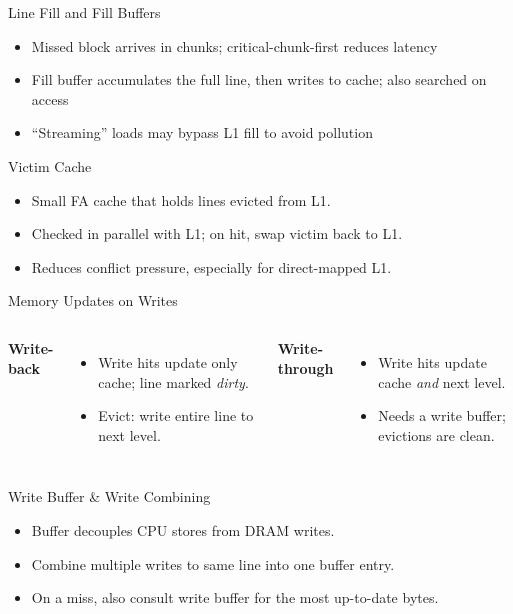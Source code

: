 \documentclass[aspectratio=169,12pt]{beamer}
\begin{document}
\begin{frame}{Line Fill and Fill Buffers}
\begin{itemize}
  \item Missed block arrives in chunks; critical-chunk-first reduces latency
  \item Fill buffer accumulates the full line, then writes to cache; also searched on access
  \item ``Streaming'' loads may bypass L1 fill to avoid pollution
\end{itemize}
\end{frame}

\begin{frame}{Victim Cache}
\begin{itemize}
  \item Small FA cache that holds lines evicted from L1.
  \item Checked in parallel with L1; on hit, swap victim back to L1.
  \item Reduces conflict pressure, especially for direct-mapped L1.
\end{itemize}
\end{frame}

\begin{frame}{Memory Updates on Writes}
\begin{columns}[T]
\textbf{Write-back}
\begin{itemize}
  \item Write hits update only cache; line marked \emph{dirty}.
  \item Evict: write entire line to next level.
\end{itemize}
\textbf{Write-through}
\begin{itemize}
  \item Write hits update cache \emph{and} next level.
  \item Needs a write buffer; evictions are clean.
\end{itemize}
\end{columns}
\end{frame}

\begin{frame}{Write Buffer \& Write Combining}
\begin{itemize}
  \item Buffer decouples CPU stores from DRAM writes.
  \item Combine multiple writes to same line into one buffer entry.
  \item On a miss, also consult write buffer for the most up-to-date bytes.
\end{itemize}
\end{frame}
\end{document}
